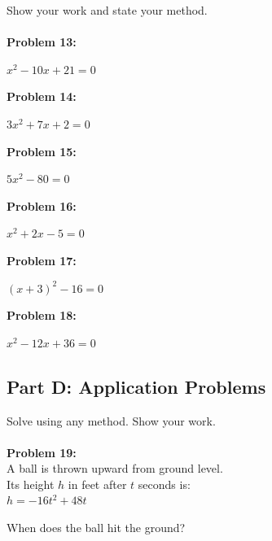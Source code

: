 \documentclass[12pt]{article}
\begin{document}
			Show your work and state your method.\\\\

			\textbf{Problem 13:}
            
            $x^2 - 10x + 21 = 0$

			\vspace{5cm}

			\textbf{Problem 14:}
            
            $3x^2 + 7x + 2 = 0$

			\vspace{5cm}

			\textbf{Problem 15:}
            
            $5x^2 - 80 = 0$

			\newpage

			\textbf{Problem 16:}
            
            $x^2 + 2x - 5 = 0$

			\vspace{5cm}

			\textbf{Problem 17:}
            
            $(x + 3)^2 - 16 = 0$

			\vspace{5cm}

			\textbf{Problem 18:}
            
            $x^2 - 12x + 36 = 0$

			\newpage

		\subsection*{Part D: Application Problems}

			Solve using any method. Show your work.\\\\

			\textbf{Problem 19:}\\

			A ball is thrown upward from ground level.\\

			Its height $h$ in feet after $t$ seconds is:\\

			$h = -16t^2 + 48t$

			\vspace{0.5cm}

			When does the ball hit the ground?

			\vspace{5cm}
\end{document}
